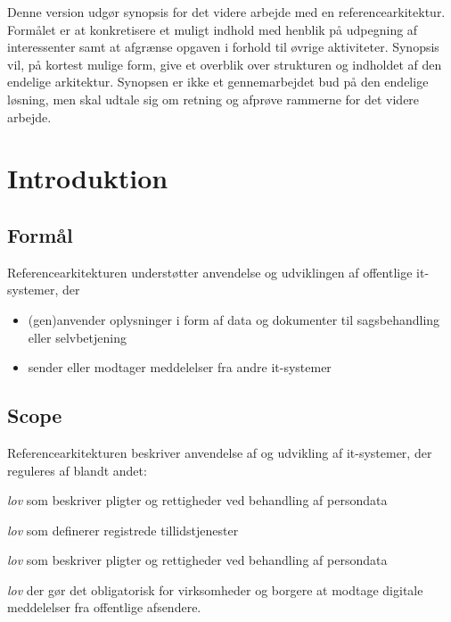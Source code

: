 Denne version udgør synopsis for det videre arbejde med en
referencearkitektur. Formålet er at konkretisere et muligt indhold med
henblik på udpegning af interessenter samt at afgrænse opgaven i forhold
til øvrige aktiviteter. Synopsis vil, på kortest mulige form, give et
overblik over strukturen og indholdet af den endelige arkitektur.
Synopsen er ikke et gennemarbejdet bud på den endelige løsning, men skal
udtale sig om retning og afprøve rammerne for det videre arbejde.

\section{Introduktion}\label{introduktion}

\subsection{Formål}\label{formuxe5l}

Referencearkitekturen understøtter anvendelse og udviklingen af
offentlige it-systemer, der

\begin{itemize}
\tightlist
\item
  (gen)anvender oplysninger i form af data og dokumenter til
  sagsbehandling eller selvbetjening
\item
  sender eller modtager meddelelser fra andre it-systemer
\end{itemize}

\subsection{Scope}\label{scope}

Referencearkitekturen beskriver anvendelse af og udvikling af
it-systemer, der reguleres af blandt andet:

\begin{description}
\tightlist
\item[EU databeskyttelse]
\emph{lov} som beskriver pligter og rettigheder ved behandling af
persondata
\item[EU eIDAS]
\emph{lov} som definerer registrede tillidstjenester
\item[Persondata lov]
\emph{lov} som beskriver pligter og rettigheder ved behandling af
persondata
\item[Lov om Digital Post]
\emph{lov} der gør det obligatorisk for virksomheder og borgere at
modtage digitale meddelelser fra offentlige afsendere.
\end{description}

